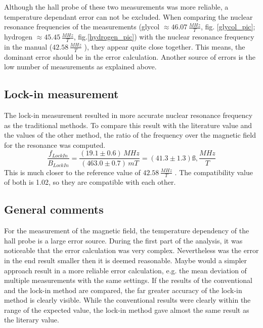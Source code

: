Although the hall probe of these two measurements was more reliable, a temperature dependant error can not be excluded. When comparing the nuclear resonance frequencies of the measurements (glycol $\approx 46.07\,\frac{MHz}{T}$, fig. \ref{glycol_pic}; hydrogen $\approx 45.45\,\frac{MHz}{T}$, fig.\ref{hydrogen_pic}) with the nuclear resonance frequency in the manual ($42.58\,\frac{MHz}{T}$ \cite{anleitung}), they appear quite close together. This means, the dominant error should be in the error calculation. Another source of errors is the low number of measurements as explained above.

\subsection{Lock-in measurement}
The lock-in measurement resulted in more accurate nuclear resonance frequency as the traditional methods. To compare this result with the literature value and the values of the other method, the ratio of the frequency over the magnetic field for the resonance was computed.
\begin{equation}
	\frac{f_{LockIn}}{B_{LockIn}} = \frac{(19.1\pm0.6)\,{MHz}}{(463.0\pm0.7)\,{mT}} = (41.3\pm1.3)ß,\frac{MHz}{T}
\end{equation}
This is much closer to the reference value of $42.58\,\frac{MHz}{T}$ \cite{anleitung}. The compatibility value of both is 1.02, so they are compatible with each other.

\subsection{General comments}

For the measurement of the magnetic field, the temperature dependency of the hall probe is a large error source.
During the first part of the analysis, it was noticeable that the error calculation was very complex. Nevertheless was the error in the end result smaller then it is deemed reasonable. Maybe would a simpler approach result in a more reliable error calculation, e.g. the mean deviation of multiple measurements with the same settings. 
If the results of the conventional and the lock-in method are compared, the far greater accuracy of the lock-in method is clearly visible. While the conventional results were clearly within the range of the expected value, the lock-in method gave almost the same result as the literary value.
